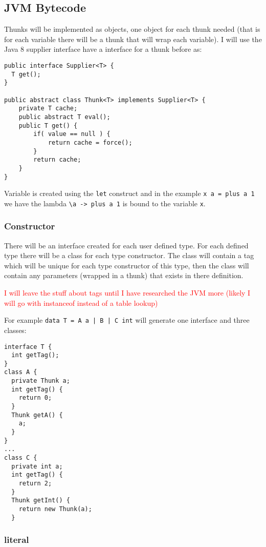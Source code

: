 \documentclass[12pt,a4paper,twoside]{article}
\begin{document}
\subsection{JVM Bytecode}

Thunks will be implemented as objects, one object for each thunk needed 
(that is for each variable there will be a thunk that will wrap each variable).
I will use the Java 8 supplier interface have a interface for a thunk before as:


\begin{verbatim}
public interface Supplier<T> {
  T get();
}

public abstract class Thunk<T> implements Supplier<T> {
    private T cache;
    public abstract T eval();
    public T get() {
        if( value == null ) {
            return cache = force();
        }
        return cache;
    }
}
\end{verbatim}

Variable is created using the \texttt{let} construct and in the example \texttt{x a = plus a 1} we have
the lambda \texttt{\textbackslash a -> plus a 1} is bound to the variable \texttt{x}.

\subsubsection{Constructor}

There will be an interface created for each user defined type. 
For each defined type there will be a class for each type constructor. The class will contain a tag which will be unique for each type constructor of this type,
then the class will contain any parameters (wrapped in a thunk) that exists in there definition.

\textcolor{red}{I will leave the stuff about tags until I have researched the JVM more (likely I will go with 
instanceof instead of a table lookup)}

For example \texttt{data T = A a | B | C int} will generate one interface and three classes:

\begin{verbatim}
interface T {
  int getTag();
}
class A {
  private Thunk a;
  int getTag() {
    return 0;
  }
  Thunk getA() {
    a;
  }
}
...
class C {
  private int a;
  int getTag() {
    return 2;
  }
  Thunk getInt() {
    return new Thunk(a);
  }
\end{verbatim}

\subsubsection{literal}
\end{document}
